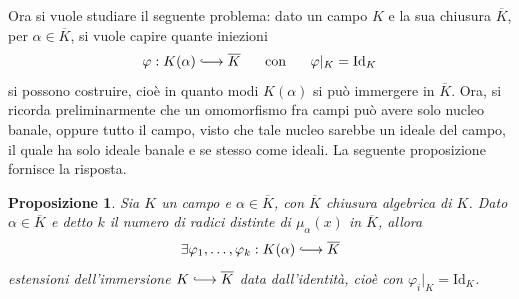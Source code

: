 \documentclass[12pt]{scrartcl}
\theoremstyle{style}
\newtheorem{prop}{Proposizione}[section]
\numberwithin{equation}{subsection}
\newcommand{\longhookrightarrow}{\lhook\joinrel\longrightarrow}
\begin{document}
\noindent Ora si vuole studiare il seguente problema: dato un campo $K$ e la sua chiusura $\overline{K}$, per $\alpha \in \overline{K}$, si vuole capire quante iniezioni
\[
\varphi :K(\alpha )\longhookrightarrow \overline{K} \hspace{.5cm} \text{ con }\hspace{.5cm}\varphi |_K = \mathrm{Id} _K
\] 
si possono costruire, cio\`e in quanto modi $K(\alpha )$ si pu\`o immergere in $\overline{K}$.
Ora, si ricorda preliminarmente che un omomorfismo fra campi pu\`o avere solo nucleo banale, oppure tutto il campo, visto che tale nucleo sarebbe un ideale del campo, il quale ha solo ideale banale e se stesso come ideali.
La seguente proposizione fornisce la risposta.
\begin{prop}\label{imext}
	Sia $K$ un campo e $\alpha \in \overline{K}$, con $\overline{K}$ chiusura algebrica di $K$.
	Dato $\alpha  \in \overline{K}$ e detto $k$ il numero di radici distinte di $\mu _\alpha (x)$ in $\overline{K}$, allora
	\[
	\exists \varphi _1,\ldots,\varphi _k : K(\alpha ) \longhookrightarrow \overline{K}
	\] 
	estensioni dell'immersione $K\longhookrightarrow \overline{K}$ data dall'identit\`a, cio\`e con $\varphi _i|_K = \mathrm{Id} _K$.
\end{prop}
\end{document}
